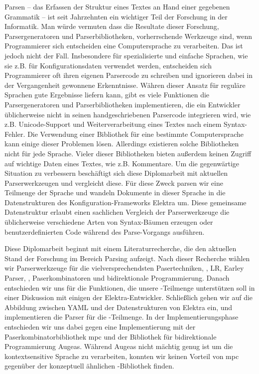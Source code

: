\begin{kurzfassung}
Parsen – das Erfassen der Struktur eines Textes an Hand einer gegebenen Grammatik – ist seit Jahrzehnten ein wichtiger Teil der Forschung in der Informatik. Man würde vermuten dass die Resultate dieser Forschung, Parsergeneratoren und Parserbibliotheken, vorherrschende Werkzeuge sind, wenn Programmierer sich entscheiden eine Computersprache zu verarbeiten. Das ist jedoch nicht der Fall. Insbesondere für spezialisierte und einfache Sprachen, wie sie z.B. für Konfigurationsdaten verwendet werden, entscheiden sich Programmierer oft ihren eigenen Parsercode zu schreiben und ignorieren dabei in der Vergangenheit gewonnene Erkenntnisse. Währen dieser Ansatz für reguläre Sprachen gute Ergebnisse liefern kann, gibt es viele Funktionen die Parsergeneratoren und Parserbibliotheken implementieren, die ein Entwickler üblicherweise nicht in seinen handgeschriebenen Parsercode integrieren wird, wie z.B. Unicode-Support und Weiterverarbeitung eines Textes nach einem Syntax-Fehler. Die Verwendung einer Bibliothek für eine bestimmte Computersprache kann einige dieser Problemen lösen. Allerdings existieren solche Bibliotheken nicht für jede Sprache. Vieler dieser Bibliotheken bieten außerdem keinen Zugriff auf wichtige Daten eines Textes, wie z.B. Kommentare. Um die gegenwärtige Situation zu verbessern beschäftigt sich diese Diplomarbeit mit aktuellen Parserwerkzeugen und vergleicht diese. Für diese Zweck parsen wir eine Teilmenge der Sprache  und wandeln Dokumente in dieser Sprache in die Datenstrukturen des Konfiguration-Frameworks Elektra um. Diese gemeinsame Datenstruktur erlaubt einen sachlichen Vergleich der Parserwerkzeuge die üblicherweise verschiedene Arten von Syntax-Bäumen erzeugen oder benutzerdefinierten Code während des Parse-Vorgangs ausführen.

Diese Diplomarbeit beginnt mit einem Literaturrecherche, die den aktuellen Stand der Forschung im Bereich Parsing aufzeigt. Nach dieser Recherche wählen wir Parserwerkzeuge für die vielversprechendsten Pasertechniken, , LR, Earley Parser, , Paserkombinatoren und bidirektionale Programmierung. Danach entschieden wir uns für die Funktionen, die unsere -Teilmenge unterstützen soll in einer Diskussion mit einigen der Elektra-Entwickler. Schließlich gehen wir auf die Abbildung zwischen YAML und der Datenstrukturen von Elektra ein, und implementieren die Parser für die -Teilmenge. In der Implementierungsphase entschieden wir uns dabei gegen eine Implementierung mit der Paserkombinatorbibliothek mpc und der Bibliothek für bidirektionale Programmierung Augeas. Während Augeas nicht mächtig genug ist um die kontextsensitive Sprache  zu verarbeiten, konnten wir keinen Vorteil von mpc gegenüber der konzeptuell ähnlichen -Bibliothek  finden.


\end{kurzfassung}
